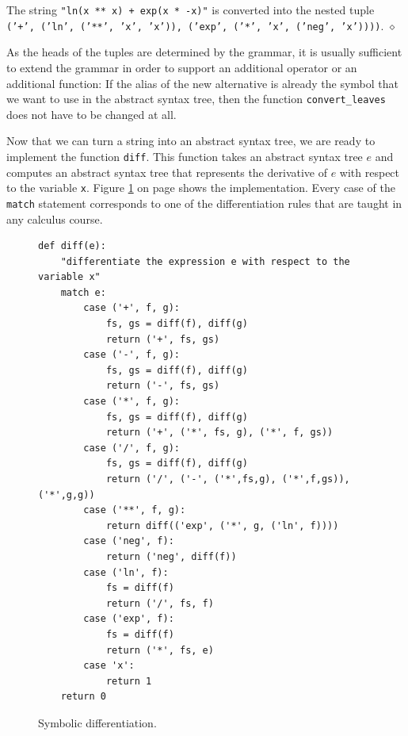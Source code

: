 \exampleEng
The string \texttt{"ln(x ** x) + exp(x * -x)"} is converted into the nested tuple
\\[0.2cm]
\hspace*{0.3cm}
\texttt{('+', ('ln', ('**', 'x', 'x')), ('exp', ('*', 'x', ('neg', 'x'))))}.
\hspace*{\fill} $\diamond$

\remarkEng
As the heads of the tuples are determined by the grammar, it is usually sufficient to extend the grammar in
order to support an additional operator or an additional function:  If the alias of the new alternative is
already the symbol that we want to use in the abstract syntax tree, then the function
\texttt{convert\_leaves} does not have to be changed at all.  \eox
\vspace*{0.1cm}

\noindent
Now that we can turn a string into an abstract syntax tree, we are ready to implement the function
\texttt{diff}.  This function takes an abstract syntax tree $e$ and computes an abstract syntax tree that
represents the derivative of $e$ with respect to the variable \texttt{x}.  Figure
\ref{fig:02-Differentiator.ipynb:diff} on page \pageref{fig:02-Differentiator.ipynb:diff} shows the
implementation.  Every case of the \texttt{match} statement corresponds to one of the differentiation
rules that are taught in any calculus course.

\begin{figure}[!ht]
\centering
\begin{verbatim}
def diff(e):
    "differentiate the expression e with respect to the variable x"
    match e:
        case ('+', f, g):
            fs, gs = diff(f), diff(g)
            return ('+', fs, gs)
        case ('-', f, g):
            fs, gs = diff(f), diff(g)
            return ('-', fs, gs)
        case ('*', f, g):
            fs, gs = diff(f), diff(g)
            return ('+', ('*', fs, g), ('*', f, gs))
        case ('/', f, g):
            fs, gs = diff(f), diff(g)
            return ('/', ('-', ('*',fs,g), ('*',f,gs)), ('*',g,g))
        case ('**', f, g):
            return diff(('exp', ('*', g, ('ln', f))))
        case ('neg', f):
            return ('neg', diff(f))
        case ('ln', f):
            fs = diff(f)
            return ('/', fs, f)
        case ('exp', f):
            fs = diff(f)
            return ('*', fs, e)
        case 'x':
            return 1
    return 0
\end{verbatim}
\vspace*{-0.3cm}
\caption{Symbolic differentiation.}
\label{fig:02-Differentiator.ipynb:diff}
\end{figure}

